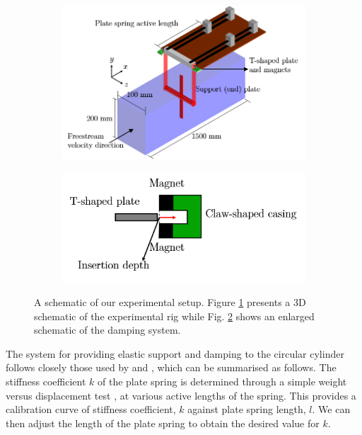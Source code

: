 \documentclass[a4paper,fleqn]{cas-sc}
\begin{document}
\begin{figure}
  \centering
  \begin{subfigure}[h]{0.5\textwidth}
    \includegraphics[width=\textwidth]{figs/figure3a}
    \caption{}
    \label{fig:rigSketch}
  \end{subfigure}

  \begin{subfigure}[h]{0.35\textwidth}
    \includegraphics[width=\textwidth]{figs/figure3b}
    \caption{}
    \label{fig:damperSketch}
  \end{subfigure}

  \caption{A schematic of our experimental setup. Figure \ref{fig:rigSketch} presents a 3D schematic of the experimental rig while Fig. \ref{fig:damperSketch} shows an enlarged schematic of the damping system.} \label{fig:experimentalSetup}
\end{figure}

The system for providing elastic support and damping to the circular cylinder follows closely those used by \citet{Kawabata2013} and \citet{Koide2013,Koide2017}, which can be summarised as follows. The stiffness coefficient $k$ of the plate spring is determined through a simple weight versus displacement test \citep{Sun2016}, at various active lengths of the spring. This provides a calibration curve of stiffness coefficient, $k$ against plate spring length, $l$. We can then adjust the length of the plate spring to obtain the desired value for $k$.
\end{document}
